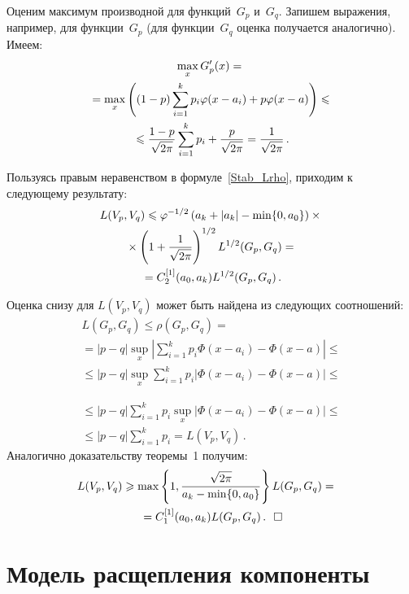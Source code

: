 \begin{multicols}{2}
Оценим максимум производной для функций~$G_p$ и~$G_q$. Запишем
выражения, например, для функции~$G_p$ (для функции~$G_q$ оценка
получается аналогично). Имеем:
\begin{multline*}
\max\limits_x G_p'(x)={}\\
{}=\max\limits_x \left((1-p)\sum\limits_{i=1}^k
p_i\varphi(x-a_i)+p\varphi(x-a)\right)\leqslant{}\\
{}\leqslant
\displaystyle\frac{\displaystyle 1-p\mathstrut}{\displaystyle \sqrt{2\pi}\mathstrut}\sum\limits_{i=1}^k p_i+
\displaystyle\frac{\displaystyle p\mathstrut}{\displaystyle \sqrt{2\pi}\mathstrut}=\displaystyle\frac{\displaystyle 1\mathstrut}{\displaystyle \sqrt{2\pi}\mathstrut}\,.
\end{multline*}

Пользуясь правым неравенством в формуле~\eqref{Stab_Lrho},
приходим к следующему результату:
\begin{multline*}
L(V_p,V_q)\leqslant\varphi^{-1/2}\left(a_k+|a_k|-\min\{0,a_0\}\right)\times{}\\
{}\times
\left(1+\displaystyle\frac{\displaystyle 1\mathstrut}{\displaystyle \sqrt{2\pi}\mathstrut}\right)^{1/2}L^{1/2}(G_p,G_q)
={}\\
{}=C_2^{[1]}(a_0,a_k)L^{1/2}(G_p,G_q)\,.
\end{multline*}

Оценка снизу для $L(V_p,V_q)$ может быть найдена из следующих
соотношений:
\begin{multline*}
L(G_p,G_q)\leqslant\rho(G_p,G_q)={}\\
{}=|p-q|\sup\limits_x\left|\sum\limits_{i=1}^k
p_i\Phi(x-a_i)-\Phi(x-a)\right|\leqslant{}\\
{}\leqslant |p-q|\sup\limits_x\sum\limits_{i=1}^k
p_i|\Phi(x-a_i)-\Phi(x-a)|\leqslant{}
\end{multline*}

\noindent
\begin{multline*}
{}\leqslant |p-q|\sum\limits_{i=1}^k
p_i\sup\limits_x|\Phi(x-a_i)-\Phi(x-a)|
\leqslant{}\\
{}\leqslant |p-q|\sum\limits_{i=1}^k p_i= L(V_p,V_q)\,.
\end{multline*}
Аналогично доказательству теоремы~1 получим:
\begin{multline*}
\hspace*{-7.22379pt}L(V_p,V_q)\geqslant\max\left\{1,\displaystyle\frac{\displaystyle \sqrt{2\pi}\mathstrut}{\displaystyle a_k-\min\{0,a_0\}\mathstrut}\right\}
L(G_p,G_q)={}\\
{}=C_1^{[1]}(a_0,a_k)L(G_p,G_q)\,.~~\square
\end{multline*}


\section{Модель расщепления компоненты}


\end{multicols}
